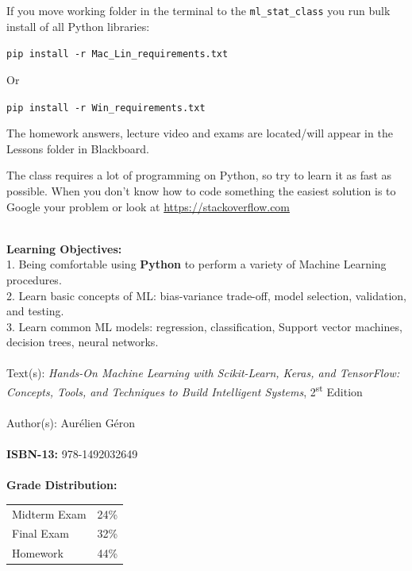 \documentclass[11pt]{article}
\begin{document}
If you move working folder in the terminal to the \texttt{ml\_stat\_class} you run bulk install of all Python libraries:

\texttt{pip install -r Mac\_Lin\_requirements.txt}

Or

\texttt{pip install -r Win\_requirements.txt}



The homework answers, lecture video and exams are located/will appear in the Lessons folder in Blackboard.



The class requires a lot of programming on Python, so try to learn it as fast as possible. When you don't know how to code something the easiest solution is to Google your problem or look at \href{https://stackoverflow.com}{https://stackoverflow.com}

\textbf{\large \\ Learning Objectives:} \\
1. Being comfortable using \textbf{Python} to perform a variety of Machine Learning procedures. \\
2. Learn basic concepts of ML: bias-variance trade-off, model selection, validation, and testing.  \\
3. Learn common ML models: regression, classification, Support vector machines, decision trees, neural networks.\\
\\
 {\large Text(s):} \emph{Hands-On Machine Learning with Scikit-Learn, Keras, and TensorFlow: Concepts, Tools, and Techniques to Build Intelligent Systems}, 2\textsuperscript{st} Edition \\\\
 {Author(s):} Aurélien Géron \\\\
  \textbf {ISBN-13:}  978-1492032649 \\\\

\textbf {\large Grade Distribution:} \\
\hspace*{40mm}
\begin{tabular}{ l l }
Midterm Exam & 24\% \\
Final Exam & 32\% \\
Homework & 44\% \\
\end{tabular} \\\\
\end{document}
